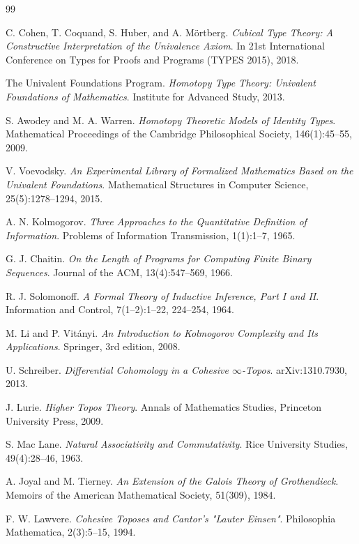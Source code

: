 \documentclass[11pt]{article}
\theoremstyle{definition}
\theoremstyle{plain}
\theoremstyle{remark}
\begin{document}
\begin{thebibliography}{99}

C. Cohen, T. Coquand, S. Huber, and A. Mörtberg.
\textit{Cubical Type Theory: A Constructive Interpretation of the Univalence Axiom}.
In 21st International Conference on Types for Proofs and Programs (TYPES 2015), 2018.

The Univalent Foundations Program.
\textit{Homotopy Type Theory: Univalent Foundations of Mathematics}.
Institute for Advanced Study, 2013.

S. Awodey and M. A. Warren.
\textit{Homotopy Theoretic Models of Identity Types}.
Mathematical Proceedings of the Cambridge Philosophical Society, 146(1):45--55, 2009.

V. Voevodsky.
\textit{An Experimental Library of Formalized Mathematics Based on the Univalent Foundations}.
Mathematical Structures in Computer Science, 25(5):1278--1294, 2015.

A. N. Kolmogorov.
\textit{Three Approaches to the Quantitative Definition of Information}.
Problems of Information Transmission, 1(1):1--7, 1965.

G. J. Chaitin.
\textit{On the Length of Programs for Computing Finite Binary Sequences}.
Journal of the ACM, 13(4):547--569, 1966.

R. J. Solomonoff.
\textit{A Formal Theory of Inductive Inference, Part I and II}.
Information and Control, 7(1--2):1--22, 224--254, 1964.

M. Li and P. Vitányi.
\textit{An Introduction to Kolmogorov Complexity and Its Applications}.
Springer, 3rd edition, 2008.

U. Schreiber.
\textit{Differential Cohomology in a Cohesive $\infty$-Topos}.
arXiv:1310.7930, 2013.

J. Lurie.
\textit{Higher Topos Theory}.
Annals of Mathematics Studies, Princeton University Press, 2009.

S. Mac Lane.
\textit{Natural Associativity and Commutativity}.
Rice University Studies, 49(4):28--46, 1963.

A. Joyal and M. Tierney.
\textit{An Extension of the Galois Theory of Grothendieck}.
Memoirs of the American Mathematical Society, 51(309), 1984.

F. W. Lawvere.
\textit{Cohesive Toposes and Cantor's "Lauter Einsen"}.
Philosophia Mathematica, 2(3):5--15, 1994.


\end{thebibliography}
\end{document}
